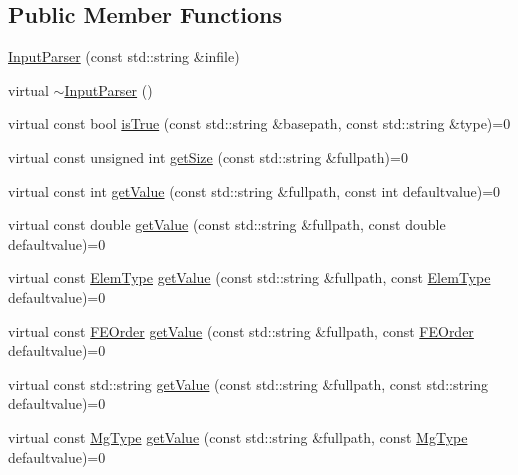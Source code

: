 \subsection*{Public Member Functions}
\begin{DoxyCompactItemize}
\item 
\mbox{\hyperlink{classfemus_1_1_input_parser_af725bf48606f5d6da52ad5c5e72b9c8f}{Input\+Parser}} (const std\+::string \&infile)
\item 
virtual \mbox{\hyperlink{classfemus_1_1_input_parser_ac42285bec1539805047252ad5245d8c6}{$\sim$\+Input\+Parser}} ()
\item 
virtual const bool \mbox{\hyperlink{classfemus_1_1_input_parser_aa9a108efd3c78de43435a43c229a21e5}{is\+True}} (const std\+::string \&basepath, const std\+::string \&type)=0
\item 
virtual const unsigned int \mbox{\hyperlink{classfemus_1_1_input_parser_a7249522721ec07de009ffd04286847c5}{get\+Size}} (const std\+::string \&fullpath)=0
\item 
virtual const int \mbox{\hyperlink{classfemus_1_1_input_parser_ae178b5210e0a7df40b7eb78133cac13c}{get\+Value}} (const std\+::string \&fullpath, const int defaultvalue)=0
\item 
virtual const double \mbox{\hyperlink{classfemus_1_1_input_parser_ab7ff8e8528d6f9e7cc6f928f7020687e}{get\+Value}} (const std\+::string \&fullpath, const double defaultvalue)=0
\item 
virtual const \mbox{\hyperlink{_elem_type_enum_8hpp_a1b014294b9757a001707c979e2bab627}{Elem\+Type}} \mbox{\hyperlink{classfemus_1_1_input_parser_a8feee424de84c28d6689361e22769ed1}{get\+Value}} (const std\+::string \&fullpath, const \mbox{\hyperlink{_elem_type_enum_8hpp_a1b014294b9757a001707c979e2bab627}{Elem\+Type}} defaultvalue)=0
\item 
virtual const \mbox{\hyperlink{_f_elem_type_enum_8hpp_a00ea9562f0dbb25e22bb3297d596e3ba}{F\+E\+Order}} \mbox{\hyperlink{classfemus_1_1_input_parser_afed8cdbe224355e291485f85dcf3a051}{get\+Value}} (const std\+::string \&fullpath, const \mbox{\hyperlink{_f_elem_type_enum_8hpp_a00ea9562f0dbb25e22bb3297d596e3ba}{F\+E\+Order}} defaultvalue)=0
\item 
virtual const std\+::string \mbox{\hyperlink{classfemus_1_1_input_parser_afc1cace4dae0ea2878d1ddd586dc6a2e}{get\+Value}} (const std\+::string \&fullpath, const std\+::string defaultvalue)=0
\item 
virtual const \mbox{\hyperlink{_mg_type_enum_8hpp_a35aafc39068a269f658aac64338aa781}{Mg\+Type}} \mbox{\hyperlink{classfemus_1_1_input_parser_a8ce06a6bc1112d4581b6fad9e7aad858}{get\+Value}} (const std\+::string \&fullpath, const \mbox{\hyperlink{_mg_type_enum_8hpp_a35aafc39068a269f658aac64338aa781}{Mg\+Type}} defaultvalue)=0

\end{DoxyCompactItemize}
